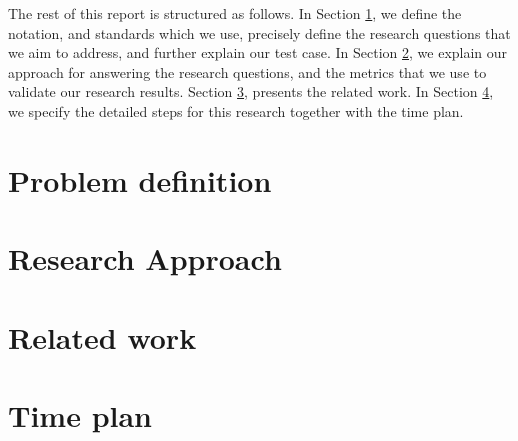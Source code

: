 \documentclass{article}
\begin{document}
The rest of this report is structured as follows.
In Section \ref{sec:pd}, we define the notation, and standards which we use, precisely define the research questions that we aim to address, and further explain our test case.
In Section \ref{sec:approach}, we explain our approach for answering the research questions, and the metrics that we use to validate our research results.
Section \ref{sec:RW}, presents the related work.
In Section \ref{sec:tp}, we specify the detailed steps for this research together with the time plan.

\section{Problem definition}\label{sec:pd}





\section{Research Approach}\label{sec:approach}

\section{Related work}\label{sec:RW}

\section{Time plan}\label{sec:tp}
\end{document}
